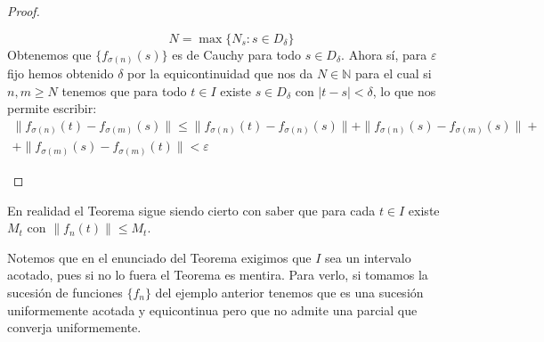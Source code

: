 \begin{teo}
\begin{proof}
\begin{enumerate}
\begin{equation*}
                    N = \max\{N_s : s\in D_\delta\}
                \end{equation*}
                Obtenemos que $\{f_{\sigma(n)}(s)\}$ es de Cauchy para todo $s\in D_\delta$. Ahora sí, para $\varepsilon$ fijo hemos obtenido $\delta$ por la equicontinuidad que nos da $N\in \mathbb{N}$ para el cual si $n,m\geq N$ tenemos que para todo $t\in I$ existe $s\in D_\delta$ con $|t-s|<\delta$, lo que nos permite escribir:
                \begin{multline*}
                    \|f_{\sigma(n)}(t) - f_{\sigma(m)}(s)\| \leq \|f_{\sigma(n)}(t) - f_{\sigma(n)}(s)\| + \|f_{\sigma(n)}(s) - f_{\sigma(m)}(s)\| + \\ + \|f_{\sigma(m)}(s) - f_{\sigma(m)}(t)\| < \varepsilon
                \end{multline*}\qedhere
        \end{enumerate}
    \end{proof}
\end{teo}

\begin{observacion}
    En realidad el Teorema sigue siendo cierto con saber que para cada $t\in I$ existe $M_t$ con $\|f_n(t)\| \leq M_t$. 
\end{observacion}

\begin{ejemplo}
    Notemos que en el enunciado del Teorema exigimos que $I$ sea un intervalo acotado, pues si no lo fuera el Teorema es mentira. Para verlo, si tomamos la sucesión de funciones $\{f_n\}$ del ejemplo anterior tenemos que es una sucesión uniformemente acotada y equicontinua pero que no admite una parcial que converja uniformemente.
\end{ejemplo}

